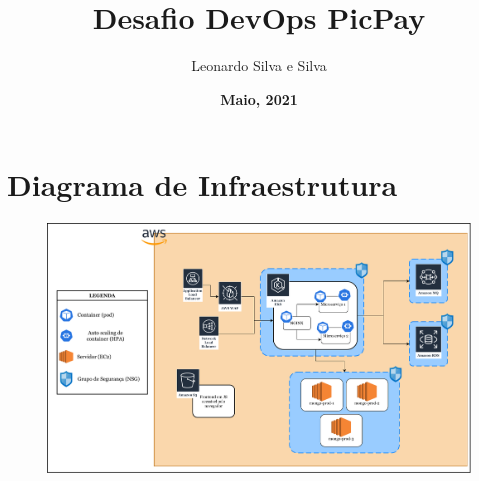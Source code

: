\documentclass{article}
\title{\textbf{Desafio DevOps PicPay}}
\author{Leonardo Silva e Silva}
\date{\textbf{Maio, 2021}}
\begin{document}
    \maketitle

    \section{Diagrama de Infraestrutura}
        \begin{figure}[h]
            \centering
            \includegraphics[width=1\textwidth]{img/desafio-picpay.pdf}
        \end{figure}
\end{document}
